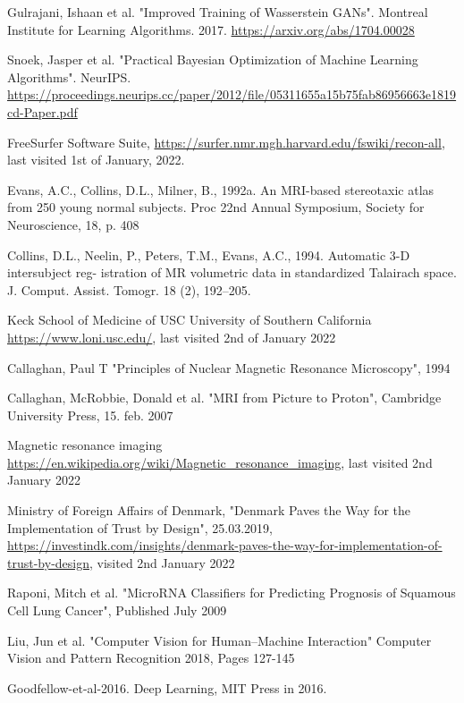 \documentclass[11pt, fleqn, titlepage]{article}
\newcommand{\1}[1]{\mathds{1}\left[#1\right]}
\begin{document}
\begin{thebibliography}{9}
		 Gulrajani, Ishaan et al. "Improved Training of Wasserstein GANs". Montreal Institute for Learning Algorithms. 2017. \url{https://arxiv.org/abs/1704.00028}
		
		 Snoek, Jasper et al. "Practical Bayesian Optimization of Machine Learning Algorithms". NeurIPS. \url{https://proceedings.neurips.cc/paper/2012/file/05311655a15b75fab86956663e1819cd-Paper.pdf}

		 FreeSurfer Software Suite, \url{https://surfer.nmr.mgh.harvard.edu/fswiki/recon-all}, last visited 1st of January, 2022.
		
		 Evans, A.C., Collins, D.L., Milner, B., 1992a. An MRI-based stereotaxic atlas from 250 young normal subjects. Proc 22nd Annual Symposium, Society for Neuroscience, 18, p. 408
		
		 Collins, D.L., Neelin, P., Peters, T.M., Evans, A.C., 1994. Automatic 3-D intersubject reg- istration of MR volumetric data in standardized Talairach space. J. Comput. Assist. Tomogr. 18 (2), 192–205.
		
		 Keck School of Medicine of USC University of Southern California \url{https://www.loni.usc.edu/}, last visited 2nd of January 2022
		
		 Callaghan, Paul T "Principles of Nuclear
		Magnetic Resonance Microscopy", 1994
		
		 Callaghan, McRobbie, Donald et al. "MRI from Picture to Proton", Cambridge University Press, 15. feb. 2007
		
		 Magnetic resonance imaging \url{https://en.wikipedia.org/wiki/Magnetic_resonance_imaging}, last visited 2nd January 2022
		
		 Ministry of Foreign Affairs of Denmark, "Denmark Paves the Way for the Implementation of Trust by Design", 25.03.2019, \url{https://investindk.com/insights/denmark-paves-the-way-for-implementation-of-trust-by-design}, visited 2nd January 2022
		
		 Raponi, Mitch et al. "MicroRNA Classifiers for Predicting Prognosis of Squamous Cell Lung Cancer", Published July 2009
		
		 Liu, Jun et al. "Computer Vision for Human–Machine Interaction" Computer Vision and Pattern Recognition 2018, Pages 127-145
		
		 Goodfellow-et-al-2016. Deep Learning, MIT Press in 2016.
		

\end{thebibliography}
\end{document}
